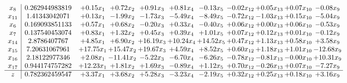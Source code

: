 \documentclass[9pt]{article}
\begin{document}
\[\begin{array}{c| c c@{\hskip 2pt} c@{\hskip 2pt} c@{\hskip 2pt} c@{\hskip 2pt} c@{\hskip 2pt} c@{\hskip 2pt} c@{\hskip 2pt} c@{\hskip 2pt} c@{\hskip 2pt} }
 x_{8}   &  0.262944983819 & +  0.15 x_{1} & +  0.72 x_{2} & +  0.91 x_{3} & +  0.81 x_{4} & -0.13 x_{5} & -0.02 x_{12} & +  0.05 x_{13} & +  0.07 x_{10} & -0.08 x_{9}\\
 x_{11}   &  1.41343042071 & +  0.13 x_{1} & -1.99 x_{2} & -1.73 x_{3} & -5.49 x_{4} & -8.49 x_{5} & -0.72 x_{12} & -1.03 x_{13} & +  0.15 x_{10} & -5.04 x_{9}\\
 x_{6}   &  0.169093851133 & +  0.57 x_{1} & +  0.68 x_{2} & -0.20 x_{3} & +  0.33 x_{4} & -0.40 x_{5} & +  0.06 x_{12} & +  0.00 x_{13} & +  0.06 x_{10} & -0.53 x_{9}\\
 x_{7}   &  0.137540453074 & +  0.83 x_{1} & +  1.32 x_{2} & +  0.45 x_{3} & +  0.39 x_{4} & +  1.01 x_{5} & +  0.07 x_{12} & +  0.12 x_{13} & +  0.01 x_{10} & -0.12 x_{9}\\
 x_{14}   &  2.8786407767 & +  4.85 x_{1} & +  6.90 x_{2} & + 16.19 x_{3} & + 10.24 x_{4} & + 14.52 x_{5} & +  0.47 x_{12} & +  1.13 x_{13} & +  0.58 x_{10} & +  3.58 x_{9}\\
 x_{15}   &  7.20631067961 & + 17.75 x_{1} & + 15.47 x_{2} & + 19.67 x_{3} & +  4.59 x_{4} & +  8.52 x_{5} & +  0.60 x_{12} & +  1.18 x_{13} & +  1.01 x_{10} & -12.68 x_{9}\\
 x_{16}   &  2.18122977346 & +  2.08 x_{1} & -11.41 x_{2} & -5.22 x_{3} & -6.70 x_{4} & -6.26 x_{5} & -0.78 x_{12} & -0.81 x_{13} & -0.00 x_{10} & + 10.31 x_{9}\\
 x_{17}   &  0.944174757282 & + 12.23 x_{1} & +  1.81 x_{2} & +  1.69 x_{3} & -0.89 x_{4} & +  1.12 x_{5} & +  0.70 x_{12} & -0.26 x_{13} & +  0.07 x_{10} & -7.27 x_{9}\\
\hline
z    &  0.782362459547 & +  3.37 x_{1} & +  3.68 x_{2} & +  5.28 x_{3} & -3.23 x_{4} & -2.19 x_{5} & +  0.32 x_{12} & +  0.25 x_{13} & +  0.18 x_{10} & +  3.16 x_{9}\\
\end{array}\]
\end{document}
